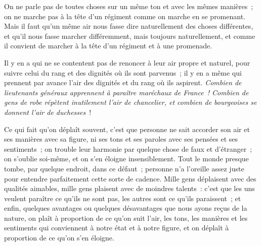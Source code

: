 \documentclass[french,twoside]{book} %
\begin{document}
On ne parle pas de toutes choses sur un même ton et avec les mêmes manières ; on ne marche pas à la tête d’un régiment comme on marche en se promenant. Mais il faut qu’un même air nous fasse dire naturellement des choses différentes, et qu’il nous fasse marcher différemment, mais toujours naturellement, et comme il convient de marcher à la tête d’un régiment et à une promenade.\par
Il y en a qui ne se contentent pas de renoncer à leur air propre et naturel, pour suivre celui du rang et des dignités où ils sont parvenus ; il y en a même qui prennent par avance l’air des dignités et du rang où ils aspirent. {\itshape Combien de lieutenants généraux apprennent à paraître maréchaux de France ! Combien de gens de robe répètent inutilement l’air de chancelier, et combien de bourgeoises se donnent l’air de duchesses} !\par
Ce qui fait qu’on déplaît souvent, c’est que personne ne sait accorder son air et ses manières avec sa figure, ni ses tons et ses paroles avec ses pensées et ses sentiments ; on trouble leur harmonie par quelque chose de faux et d’étranger ; on s’oublie soi-même, et on s’en éloigne insensiblement. Tout le monde presque tombe, par quelque endroit, dans ce défaut ; personne n’a l’oreille assez juste pour entendre parfaitement cette sorte de cadence. Mille gens déplaisent avec des qualités aimables, mille gens plaisent avec de moindres talents : c’est que les uns veulent paraître ce qu’ils ne sont pas, les autres sont ce qu’ils paraissent ; et enfin, quelques avantages ou quelques désavantages que nous ayons reçus de la nature, on plaît à proportion de ce qu’on suit l’air, les tons, les manières et les sentiments qui conviennent à notre état et à notre figure, et on déplaît à proportion de ce qu’on s’en éloigne.
\end{document}
